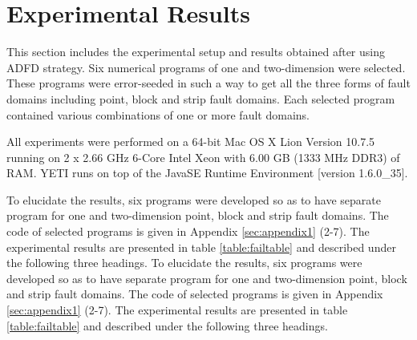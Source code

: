
\section{Experimental Results} \label{sec:experimentalResults}
This section includes the experimental setup and results obtained after using ADFD strategy. Six numerical programs of one and two-dimension were selected. These programs were error-seeded in such a way to get all the three forms of fault domains including point, block and strip fault domains. Each selected program contained various combinations of one or more fault domains. 

All experiments were performed on a 64-bit Mac OS X Lion Version 10.7.5 running on 2 x 2.66 GHz 6-Core Intel Xeon with 6.00 GB (1333 MHz DDR3) of RAM. YETI runs on top of the Java\texttrademark  SE Runtime Environment [version 1.6.0\_35]. 

To elucidate the results, six programs were developed so as to have separate program for one and two-dimension point, block and strip fault domains. The code of selected programs is given in Appendix \ref{sec:appendix1} (2-7). The experimental results are presented in table \ref{table:failtable} and described under the following three headings.
To elucidate the results, six programs were developed so as to have separate program for one and two-dimension point, block and strip fault domains. The code of selected programs is given in Appendix \ref{sec:appendix1} (2-7). The experimental results are presented in table \ref{table:failtable} and described under the following three headings.


